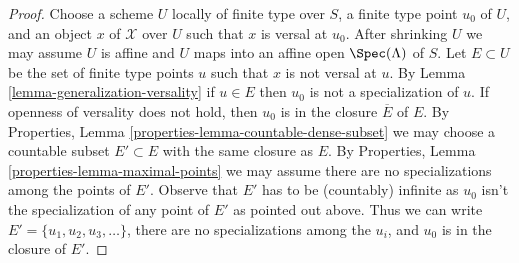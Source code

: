 \begin{proof}
Choose a scheme $U$ locally of finite type over $S$,
a finite type point $u_0$ of $U$, and an object $x$ of $\mathcal{X}$
over $U$ such that $x$ is versal at $u_0$. After shrinking
$U$ we may assume $U$ is affine and $U$ maps into an affine open
$\Spec(\Lambda)$ of $S$. Let $E \subset U$ be the set of finite type
points $u$ such that $x$ is not versal at $u$. By
Lemma \ref{lemma-generalization-versality}
if $u \in E$ then $u_0$ is not a specialization of $u$.
If openness of versality does not hold, then $u_0$ is in the closure
$\overline{E}$ of $E$. By
Properties, Lemma \ref{properties-lemma-countable-dense-subset}
we may choose a countable subset $E' \subset E$ with the same closure
as $E$. By Properties, Lemma \ref{properties-lemma-maximal-points}
we may assume there are no specializations among the points of $E'$.
Observe that $E'$ has to be (countably) infinite as $u_0$
isn't the specialization of any point of $E'$ as pointed out above.
Thus we can write $E' = \{u_1, u_2, u_3, \ldots\}$, there
are no specializations among the $u_i$, and $u_0$ is in the closure
of $E'$.


\end{proof}
